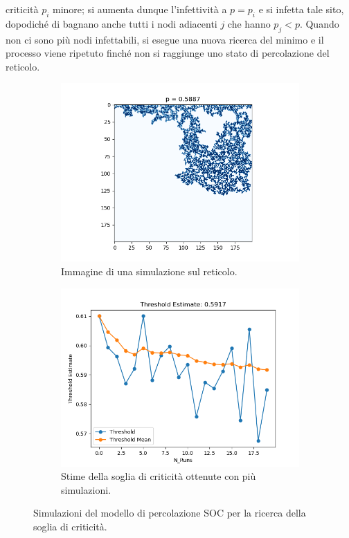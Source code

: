 \documentclass{article}
\begin{document}
    criticità $p_i$ minore; si aumenta dunque l'infettività a $p=p_i$ e si infetta tale sito, dopodiché di bagnano anche
    tutti i nodi adiacenti $j$ che hanno $p_j<p$. Quando non ci sono più nodi infettabili, si esegue una nuova ricerca del minimo
    e il processo viene ripetuto finché non si raggiunge uno stato di percolazione del reticolo.\\
    \begin{figure}[H]
        \centering
        \begin{subfigure}[b]{0.49\linewidth}
         \centering
         \includegraphics[width=\linewidth]{../images/invasionpercolation_image}
            \caption{Immagine di una simulazione sul reticolo.}
     \end{subfigure}
        \hfill
        \begin{subfigure}[b]{0.49\linewidth}
         \centering
         \includegraphics[width=\linewidth]{../images/invasionpercolation}
            \caption{Stime della soglia di criticità ottenute con più simulazioni.}
     \end{subfigure}
     \caption{Simulazioni del modello di percolazione SOC per la ricerca della soglia di criticità.}
     \label{fig:invasion_percolation}
    \end{figure}
\end{document}
